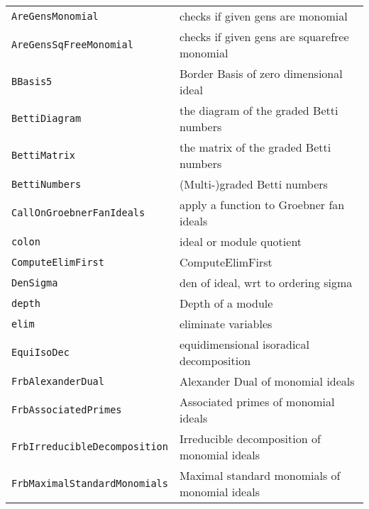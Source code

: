 \documentclass[a4paper]{mybook}
\begin{document}
\begin{center}
\begin{longtable}{ll}
   
{\verb~AreGensMonomial~} &
      checks if given gens are monomial\\
   
{\verb~AreGensSqFreeMonomial~} &
      checks if given gens are squarefree monomial\\
   
{\verb~BBasis5~} &
      Border Basis of zero dimensional ideal\\
   
{\verb~BettiDiagram~} &
      the diagram of the graded Betti numbers\\
   
{\verb~BettiMatrix~} &
      the matrix of the graded Betti numbers\\
   
{\verb~BettiNumbers~} &
      (Multi-)graded Betti numbers\\
   
{\verb~CallOnGroebnerFanIdeals~} &
      apply a function to Groebner fan ideals\\
   
{\verb~colon~} &
      ideal or module quotient\\
   
{\verb~ComputeElimFirst~} &
      ComputeElimFirst\\
   
{\verb~DenSigma~} &
      den of ideal, wrt to ordering sigma\\
   
{\verb~depth~} &
      Depth of a module\\
   
{\verb~elim~} &
      eliminate variables\\
   
{\verb~EquiIsoDec~} &
      equidimensional isoradical decomposition\\
   
{\verb~FrbAlexanderDual~} &
      Alexander Dual of monomial ideals\\
   
{\verb~FrbAssociatedPrimes~} &
      Associated primes of monomial ideals\\
   
{\verb~FrbIrreducibleDecomposition~} &
      Irreducible decomposition of monomial ideals\\
   
{\verb~FrbMaximalStandardMonomials~} &
      Maximal standard monomials of monomial ideals\\
   

\end{longtable}
\end{center}
\end{document}
